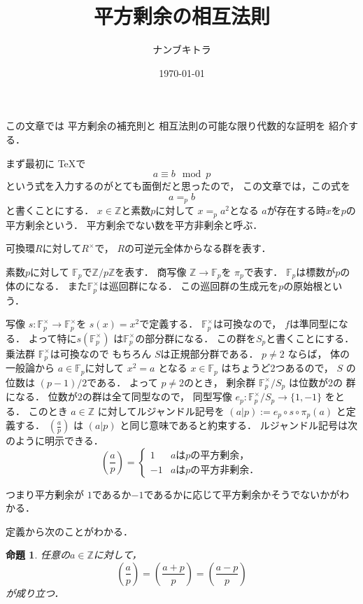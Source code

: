 \documentclass[leqno, 12pt]{jsarticle}
\title{平方剰余の相互法則}
\author{ナンブキトラ}
\date{\today}
\newtheorem{prop}[thm]{命題}
\newcommand{\zz}{\mathbb{Z}}
\newcommand{\ff}{\mathbb{F}}
\newcommand{\dpst}{\displaystyle}
\begin{document}
\maketitle

この文章では
平方剰余の補充則と
相互法則の可能な限り代数的な証明を
紹介する．


まず最初に
\TeX で
\[
a\equiv b \mod p
\]
という式を入力するのがとても面倒だと思ったので，
この文章では，この式を
\[
a=_{p} b
\]
と書くことにする．
$x\in \zz$と素数$p$に対して
$x=_pa^2$となる
$a$が存在する時$x$を$p$の平方剰余という．
平方剰余でない数を平方非剰余と呼ぶ．

可換環$R$に対して$R^{\times}$で，
$R$の可逆元全体からなる群を表す．

素数$p$に対して
$\ff_p$で$\zz/p\zz$を表す．
商写像
$\zz\to \ff_p$を
$\pi_p$で表す．
$\ff_p$は標数が$p$の体のになる．
また$\ff_p^{\times}$は巡回群になる．
この巡回群の生成元を$p$の原始根という．

写像
$s:\ff_p^{\times}\to \ff_p^{\times}$を
$s(x)=x^2$で定義する．
$\ff_p^{\times}$は可換なので，
$f$は準同型になる．
よって特に$s(\ff_p^{\times})$
は$\ff_p^{\times}$の部分群になる．
この群を$S_p$と書くことにする．
乗法群
$\ff_p^{\times}$は可換なので
もちろん
$S$は正規部分群である．
$p\neq 2$
ならば，
体の一般論から
$a\in \ff_p$に対して
$x^2=a$
となる
$x\in \ff_p$
はちょうど2つあるので，
$S$
の位数は
$(p-1)/2$である．
よって
$p\neq 2$のとき，
剰余群
$\ff_p^{\times}/S_p$
は位数が2の
群になる．
位数が$2$の群は全て同型なので，
同型写像
$e_p:\ff_p^{\times}/S_p\to \{1, -1\}$
をとる．
このとき
$a\in \zz$
に対してルジャンドル記号を
$(a|p):=e_p\circ s\circ \pi_p(a)$
と定義する．
$\dpst \left (\frac{a}{p}\right)$
は
$(a|p)$
と同じ意味であると約束する．
ルジャンドル記号は次のように明示できる．
\[
\left(\frac{a}{p}\right)=
\begin{cases}
1 & \text{$a$は$p$の平方剰余，}\\
-1 & \text{$a$は$p$の平方非剰余．}
\end{cases}
\]

つまり平方剰余が
$1$であるか$-1$であるかに応じて平方剰余かそうでないかがわかる．


定義から次のことがわかる．
\begin{prop}
任意の$a\in \zz$に対して，
\[
\left(\frac{a}{p}\right)=\left(\frac{a+p}{p}\right)=\left(\frac{a-p}{p}\right)
\]
が成り立つ．
\end{prop}
\end{document}
